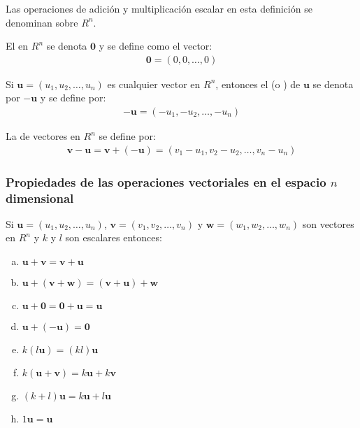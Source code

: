\documentclass[a4paper,12pt]{article}
\begin{document}
Las operaciones de adición y multiplicación escalar en esta definición se
denominan  sobre $R^n$.

El  en $R^n$ se denota $\mathbf{0}$ y se define como el
vector:
\begin{align*}
  \mathbf{0}=(0,0,\ldots,0)
\end{align*}

Si $\mathbf{u}=(u_1,u_2,\ldots,u_n)$ es cualquier vector en $R^n$, entonces el
 (o ) de $\mathbf{u}$ se denota por
$-\mathbf{u}$ y se define por:
\begin{align*}
  -\mathbf{u}=(-u_1,-u_2,\ldots,-u_n)
\end{align*}

La  de vectores en $R^n$ se define por:
\begin{align*}
  \mathbf{v}-\mathbf{u}=\mathbf{v}+(-\mathbf{u})=(v_1-u_1,v_2-u_2,\ldots,v_n-u_n)
\end{align*}

\subsubsection{Propiedades de las operaciones vectoriales en el espacio
$n$ dimensional}

\begin{theorem}
  Si $\mathbf{u}=(u_1,u_2,\ldots,u_n)$, $\mathbf{v}=(v_1,v_2,\ldots,v_n)$ y
  $\mathbf{w}=(w_1,w_2,\ldots,w_n)$ son vectores en $R^n$ y $k$ y $l$ son
  escalares entonces:
  \begin{enumerate}[(a)]
    \item $\mathbf{u}+\mathbf{v}=\mathbf{v}+\mathbf{u}$
    \item
      $\mathbf{u}+(\mathbf{v}+\mathbf{w})=(\mathbf{v}+\mathbf{u})+\mathbf{w}$
    \item $\mathbf{u}+\mathbf{0}=\mathbf{0}+\mathbf{u}=\mathbf{u}$
    \item $\mathbf{u}+(-\mathbf{u})=\mathbf{0}$
    \item $k(l\mathbf{u})=(kl)\mathbf{u}$
    \item $k(\mathbf{u}+\mathbf{v})=k\mathbf{u}+k\mathbf{v}$
    \item $(k+l)\mathbf{u}=k\mathbf{u}+l\mathbf{u}$
    \item $1\mathbf{u}=\mathbf{u}$
  \end{enumerate}
  \label{theo:prop_esp_vec}
\end{theorem}
\end{document}
